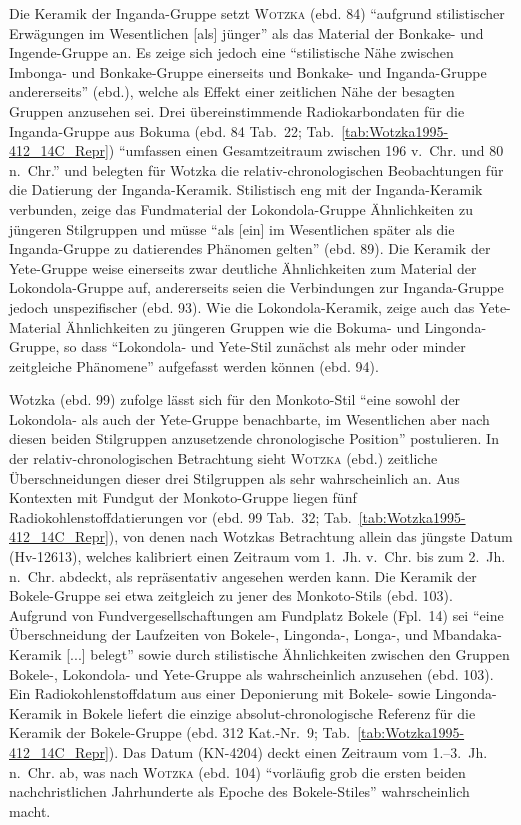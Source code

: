 Die Keramik der Inganda-Gruppe setzt \textsc{Wotzka} (ebd. 84) \enquote{aufgrund stilistischer Erwägungen im Wesentlichen [als] jünger} als das Material der Bonkake- und Ingende-Gruppe an. Es zeige sich jedoch eine \enquote{stilistische Nähe zwischen Imbonga- und Bonkake-Gruppe einerseits und Bonkake- und Inganda-Gruppe andererseits} (ebd.), welche als Effekt einer zeitlichen Nähe der besagten Gruppen anzusehen sei. Drei übereinstimmende Radiokarbondaten für die Inganda-Gruppe aus Bokuma (ebd. 84 Tab.~22; Tab.~\ref{tab:Wotzka1995-412_14C_Repr}) \enquote{umfassen einen Gesamtzeitraum zwischen 196 v.~Chr. und 80 n.~Chr.} und belegten für Wotzka die relativ-chronologischen Beobachtungen für die Datierung der Inganda-Keramik. Stilistisch eng mit der Inganda-Keramik verbunden, zeige das Fundmaterial der Lokondola-Gruppe Ähnlichkeiten zu jüngeren Stilgruppen und müsse \enquote{als [ein] im Wesentlichen später als die Inganda-Gruppe zu datierendes Phänomen gelten} (ebd. 89). Die Keramik der Yete-Gruppe weise einerseits zwar deutliche Ähnlichkeiten zum Material der Lokondola-Gruppe auf, andererseits seien die Verbindungen zur Inganda-Gruppe jedoch unspezifischer (ebd. 93). Wie die Lokondola-Keramik, zeige auch das Yete-Material Ähnlichkeiten zu jüngeren Gruppen wie die Bokuma- und Lingonda-Gruppe, so dass \enquote{Lokondola- und Yete-Stil zunächst als mehr oder minder zeitgleiche Phänomene} aufgefasst werden können (ebd. 94).

Wotzka (ebd. 99) zufolge lässt sich für den Monkoto-Stil \enquote{eine sowohl der Lokondola- als auch der Yete-Gruppe benachbarte, im Wesentlichen aber nach diesen beiden Stilgruppen anzusetzende chronologische Position} postulieren. In der relativ-chronologischen Betrachtung sieht \textsc{Wotzka} (ebd.) zeitliche Überschneidungen dieser drei Stilgruppen als sehr wahrscheinlich an. Aus Kontexten mit Fundgut der Monkoto-Gruppe liegen fünf Radiokohlenstoffdatierungen vor (ebd. 99 Tab.~32; Tab.~\ref{tab:Wotzka1995-412_14C_Repr}), von denen nach Wotzkas Betrachtung allein das jüngste Datum (Hv-12613), welches kalibriert einen Zeitraum vom 1.~Jh. v.~Chr. bis zum 2.~Jh. n.~Chr. abdeckt, als repräsentativ angesehen werden kann. Die Keramik der Bokele-Gruppe sei etwa zeitgleich zu jener des Monkoto-Stils (ebd. 103). Aufgrund von Fundvergesellschaftungen am Fundplatz Bokele (Fpl.~14) sei \enquote{eine Überschneidung der Laufzeiten von Bokele-, \mbox{Lingonda-,} Longa-, und Mbandaka-Keramik [...] belegt} sowie durch stilistische Ähnlichkeiten zwischen den Gruppen Bokele-, Lokondola- und Yete-Gruppe als wahrscheinlich anzusehen (ebd. 103). Ein Radiokohlenstoffdatum aus einer Deponierung mit Bokele- sowie Lingonda-Keramik in Bokele liefert die einzige absolut-chronologische Referenz für die Keramik der Bokele-Gruppe (ebd. 312 Kat.-Nr.~9; Tab.~\ref{tab:Wotzka1995-412_14C_Repr}). Das Datum (KN-4204) deckt einen Zeitraum vom \mbox{1.--3.~Jh.} n.~Chr. ab, was nach \textsc{Wotzka} (ebd. 104) \enquote{vorläufig grob die ersten beiden nachchristlichen Jahrhunderte als Epoche des Bokele-Stiles} wahrscheinlich macht.

